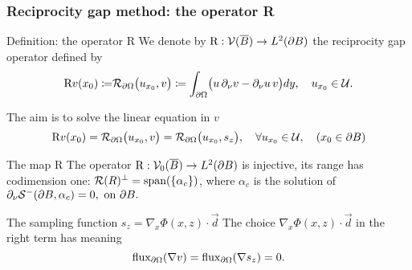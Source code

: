 \documentclass[10pt,xcolor={dvipsnames}]{beamer}
\theoremstyle{plain}
\theoremstyle{plain}
\begin{document}
\begin{frame}
 \frametitle{Reciprocity gap method: the operator R}
\begin{block}{Definition: the operator R}
 \footnotesize
{
 We denote by $\textup{R} : \mathcal{V}(\overline{B})\to L^2(\partial B)$ the {\color{blue}reciprocity gap operator}
 defined by}
\begin{equation}
 {
 \textup{R}v(x_0)\coloneqq }
 \mathcal{R}_{\partial\Omega}\bigl(u_{x_0},v\bigr)
 \coloneqq \int_{\partial \Omega}\bigl(u\,\partial_\nu v - \partial_\nu u \,v \bigr)dy,\quad u_{x_0}\in\mathcal{U}.
\end{equation}
\end{block}
{\footnotesize
  The aim is to solve the linear equation in $v$}
\begin{equation}
 \textup{R}v(x_0) = 
 \mathcal{R}_{\partial\Omega}\bigl(u_{x_0},v\bigr) = 
 \mathcal{R}_{\partial\Omega}\bigl(u_{x_0},s_z\bigr),\quad \forall u_{x_0}\in\mathcal{U}, 
 \quad (x_0\in\partial B)
\end{equation}

 \begin{block}{The map R}
  \footnotesize
 The operator $\textup{R} : \mathcal{V}_0(\overline{B})\to L^2(\partial B)$ is injective,
its range has codimension one: $\mathcal{R}(R)^\perp=\textup{span}(\{\alpha_c\})$,
 where $\alpha_c$ is the solution of 
 $
  \partial_\nu \mathcal{S}^-(\partial B,\alpha_c) = 0,\textup{ on }\partial B.
 $
 \end{block}
 \begin{block}{The {\color{blue}sampling function} $s_z = \nabla_x\Phi(x,z)\cdot \vec{d}$}
 \footnotesize
 The choice $\nabla_x\Phi(x,z)\cdot \vec{d}$ in the right term has meaning
 \begin{equation*}
  \textup{flux}_{\partial\Omega}(\nabla v) = \textup{flux}_{\partial\Omega}(
  \nabla s_z)=0 .
 \end{equation*}
 \end{block}



\end{frame}
\end{document}
